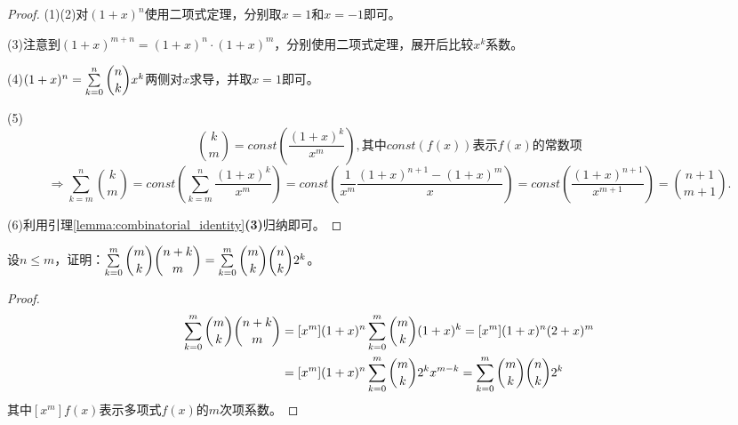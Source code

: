         \begin{proof}
            (1)(2)对$(1+x)^n$使用二项式定理，分别取$x=1$和$x=-1$即可。

            (3)注意到$(1+x)^{m+n}=(1+x)^n\cdot(1+x)^m$，分别使用二项式定理，展开后比较$x^{k}$系数。

            (4)$(1+x)^n=\sum\limits_{k=0}^{n}\dbinom{n}{k}x^{k}$两侧对$x$求导，并取$x=1$即可。

            (5)
            \begin{equation}
                \label{eq:binomial_step6}
                \binom{k}{m}=const\left(\frac{(1+x)^k}{x^m}\right),\text{其中}const(f(x))\text{表示}f(x)\text{的常数项}
                \nonumber
            \end{equation}
            \begin{equation}
                \label{eq:binomial_step7}
                \Rightarrow \sum_{k=m}^n\binom{k}{m}=const\left(\sum_{k=m}^n\frac{(1+x)^k}{x^m}\right)=const\left(\frac1{x^{m}}\frac{(1+x)^{n+1}-(1+x)^{m}}{x}\right)=const\left(\frac{(1+x)^{n+1}}{x^{m+1}}\right)=\binom{n+1}{m+1}.
                \nonumber
            \end{equation}

            (6)利用引理\ref{lemma:combinatorial_identity}\textbf{(3)}归纳即可。
        \end{proof}

        \begin{example}
            设$n\leq m$，证明：$\sum\limits_{k=0}^{m}\dbinom{m}{k}\dbinom{n+k}{m}=\sum\limits_{k=0}^{m}\dbinom{m}{k}\dbinom{n}{k}2^k$。
        \end{example}

        \begin{proof}
            \begin{equation*}
                \begin{split}
                    \sum\limits_{k=0}^{m}\dbinom{m}{k}\dbinom{n+k}{m}&=[x^m](1+x)^n\sum_{k=0}^m\binom{m}{k}(1+x)^k=[x^m](1+x)^{n}(2+x)^m \\
                                                                     &=[x^m](1+x)^n\sum_{k=0}^m\binom{m}{k}2^{k}x^{m-k}=\sum_{k=0}^{m}\dbinom{m}{k}\dbinom{n}{k}2^k
                \end{split}
            \end{equation*}
            其中$[x^m]f(x)$表示多项式$f(x)$的$m$次项系数。
        \end{proof}
